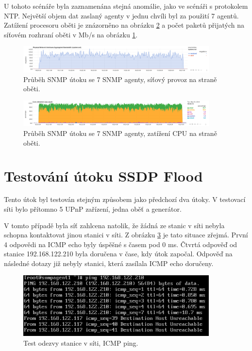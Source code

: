 U tohoto scénáře byla zaznamenána stejná anomálie, jako ve scénáři s protokolem NTP. Největší objem dat zaslaný agenty v jednu chvíli byl za použití 7 agentů. Zatížení procesoru oběti je znázorněno na obrázku \ref{fig:graph_snmp_cpu_5ampl} a počet paketů přijatých na síťovém rozhraní oběti v Mb/s na obrázku \ref{fig:graph_snmp_traffic_5ampl}.

\begin{figure} [h]
	\centering
	\includegraphics[width=0.9\textwidth]
	{obrazky/grafy/graph_ntp_traffic_7ampl.png}
	\caption{Průběh SNMP útoku se 7 SNMP agenty, síťový provoz na straně oběti.}
	\label{fig:graph_snmp_traffic_5ampl}
\end{figure}

\begin{figure} [h]
	\centering
	\includegraphics[width=0.9\textwidth]
	{obrazky/grafy/graph_ntp_cpu_7ampl.png}
	\caption{Průběh SNMP útoku se 7 SNMP agenty, zatížení CPU na straně oběti.}
	\label{fig:graph_snmp_cpu_5ampl}
\end{figure}



\section{Testování útoku SSDP Flood}
Tento útok byl testován  stejným způsobem jako předchozí dva útoky. V testovací síti bylo přítomno 5 UPnP zařízení, jedna oběť a generátor.

V tomto případě byla síť zahlcena natolik, že žádná ze stanic v síti nebyla schopna kontaktovat jinou stanici v síti. Z obrázku \ref{fig:ping_ntp_5_ampl} je tato situace zřejmá. První 4 odpovědi na ICMP echo byly úspěšné s časem pod 0 ms. Čtvrtá odpověď od stanice 192.168.122.210 byla doručena v čase, kdy útok započal. Odpověď na následné dotazy již nebyly stanici, která zasílala ICMP echo doručeny. 

\begin{figure} [h]
	\centering
	\includegraphics[width=0.9\textwidth]
	{obrazky/grafy/ping_ntp_5ampl.png}
	\caption{Test odezvy stanice v síti, ICMP ping.}
	\label{fig:ping_ntp_5_ampl}
\end{figure}
